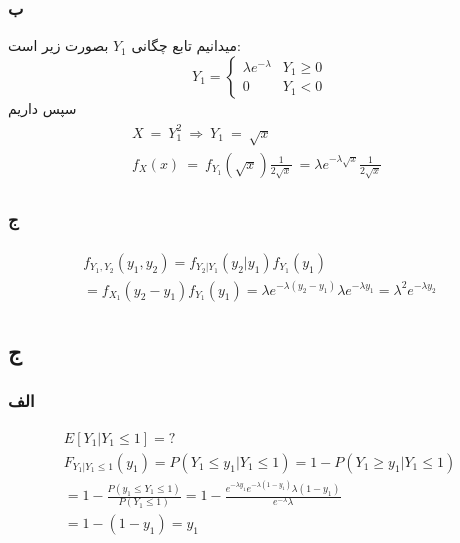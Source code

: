 \documentclass{article}[12pt]
\begin{document}
\subsubsection{ب}

میدانیم تابع چگانی 
$Y_1$
بصورت زیر است:
\begin{equation}
	Y_{1} =\begin{cases}
		\lambda e^{-\lambda } & Y_{1} \geqslant 0\\
		0 & Y_{1} < 0
	\end{cases}
\end{equation}
سپس داریم
\begin{equation}
	\begin{split}
		 \begin{array}{c}
			X\ =\ Y_{1}^{2} \ \Longrightarrow \ Y_{1} \ =\ \sqrt{x}\\
			f_{X}( x) \ =\ f_{Y_{1}}\left(\sqrt{x}\right)\frac{1}{2\sqrt{x}} \ =\lambda e^{-\lambda \sqrt{x}}\frac{1}{2\sqrt{x}} \ \ 
		\end{array}
	\end{split}
\end{equation}
\subsubsection{ج}	

\begin{equation}
	\begin{split}
		  \begin{array}{c}
		 	f_{Y_{1} ,Y_{2}}( y_{1} ,y_{2}) =f_{Y_{2} |Y_{1}}( y_{2} |y_{1}) f_{Y_{1}}( y_{1})\\
		 	=f_{X_{1}}( y_{2} -y_{1}) f_{Y_{1}}( y_{1}) =\lambda e^{-\lambda ( y_{2} -y_{1})} \lambda e^{-\lambda y_{1}} =\lambda ^{2} e^{-\lambda y_{2}}
		 \end{array}
	\end{split}
\end{equation}


\subsection{ج}
\subsubsection{الف}

\begin{equation}
	\begin{gathered}
				E[ Y_{1} |Y_{1} \leqslant 1] =?\\
				F_{Y_{1} |Y_{1} \leqslant 1}( y_{1}) =P( Y_{1} \leqslant y_{1} |Y_{1} \leqslant 1) =1-P( Y_{1} \geqslant y_{1} |Y_{1} \leqslant 1)\\
				=1-\frac{P( y_{1} \leqslant Y_{1} \leqslant 1)}{P( Y_{1} \leqslant 1)} =1-\frac{e^{-\lambda y_{1}} e^{-\lambda ( 1-y_{1})} \lambda ( 1-y_{1})}{e^{-\lambda } \lambda }\\
				=1-( 1-y_{1}) =y_{1}
	\end{gathered}
\end{equation}
\end{document}
